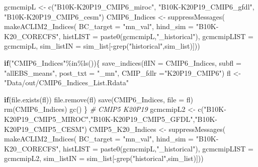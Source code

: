 \documentclass[
]{article}
\newenvironment{Shaded}{\begin{snugshade}}{\end{snugshade}}
\newcommand{\AttributeTok}[1]{\textcolor[rgb]{0.77,0.63,0.00}{#1}}
\newcommand{\CommentTok}[1]{\textcolor[rgb]{0.56,0.35,0.01}{\textit{#1}}}
\newcommand{\ControlFlowTok}[1]{\textcolor[rgb]{0.13,0.29,0.53}{\textbf{#1}}}
\newcommand{\FunctionTok}[1]{\textcolor[rgb]{0.00,0.00,0.00}{#1}}
\newcommand{\NormalTok}[1]{#1}
\newcommand{\OtherTok}[1]{\textcolor[rgb]{0.56,0.35,0.01}{#1}}
\newcommand{\SpecialCharTok}[1]{\textcolor[rgb]{0.00,0.00,0.00}{#1}}
\newcommand{\StringTok}[1]{\textcolor[rgb]{0.31,0.60,0.02}{#1}}
\begin{document}
\begin{Shaded}
\begin{Highlighting}[]
\NormalTok{    gcmcmipL }\OtherTok{\textless{}{-}} \FunctionTok{c}\NormalTok{(}\StringTok{"B10K{-}K20P19\_CMIP6\_miroc"}\NormalTok{,}
                  \StringTok{"B10K{-}K20P19\_CMIP6\_gfdl"}\NormalTok{,}
                  \StringTok{"B10K{-}K20P19\_CMIP6\_cesm"}\NormalTok{) }
\NormalTok{    CMIP6\_Indices }\OtherTok{\textless{}{-}} \FunctionTok{suppressMessages}\NormalTok{(}
                        \FunctionTok{makeACLIM2\_Indices}\NormalTok{(}
                        \AttributeTok{BC\_target =} \StringTok{"mn\_val"}\NormalTok{,}
                        \AttributeTok{hind\_sim  =}  \StringTok{"B10K{-}K20\_CORECFS"}\NormalTok{,}
                        \AttributeTok{histLIST  =} \FunctionTok{paste0}\NormalTok{(gcmcmipL,}\StringTok{"\_historical"}\NormalTok{),}
                        \AttributeTok{gcmcmipLIST =}\NormalTok{ gcmcmipL,}
                        \AttributeTok{sim\_listIN =}\NormalTok{ sim\_list[}\SpecialCharTok{{-}}\FunctionTok{grep}\NormalTok{(}\StringTok{"historical"}\NormalTok{,sim\_list)]))}
    
     \ControlFlowTok{if}\NormalTok{(}\StringTok{"CMIP6\_Indices"}\SpecialCharTok{\%in\%}\FunctionTok{ls}\NormalTok{())\{                 }
      \FunctionTok{save\_indices}\NormalTok{(}\AttributeTok{flIN =}\NormalTok{ CMIP6\_Indices, }
                   \AttributeTok{subfl =} \StringTok{"allEBS\_means"}\NormalTok{,}
                   \AttributeTok{post\_txt =} \StringTok{"\_mn"}\NormalTok{,}
                   \AttributeTok{CMIP\_fdlr =}\StringTok{"K20P19\_CMIP6"}\NormalTok{)}
\NormalTok{      fl }\OtherTok{\textless{}{-}} \StringTok{"Data/out/CMIP6\_Indices\_List.Rdata"}
      
      \ControlFlowTok{if}\NormalTok{(}\FunctionTok{file.exists}\NormalTok{(fl)) }\FunctionTok{file.remove}\NormalTok{(fl)}
      \FunctionTok{save}\NormalTok{(CMIP6\_Indices, }\AttributeTok{file =}\NormalTok{ fl)}
      \FunctionTok{rm}\NormalTok{(CMIP6\_Indices)}
      \FunctionTok{gc}\NormalTok{()}
\NormalTok{     \}}
    \CommentTok{\# CMIP5 K20P19}
\NormalTok{    gcmcmipL2 }\OtherTok{\textless{}{-}} \FunctionTok{c}\NormalTok{(}\StringTok{"B10K{-}K20P19\_CMIP5\_MIROC"}\NormalTok{,}\StringTok{"B10K{-}K20P19\_CMIP5\_GFDL"}\NormalTok{,}\StringTok{"B10K{-}K20P19\_CMIP5\_CESM"}\NormalTok{) }
\NormalTok{    CMIP5\_K20\_Indices }\OtherTok{\textless{}{-}} \FunctionTok{suppressMessages}\NormalTok{(}
                        \FunctionTok{makeACLIM2\_Indices}\NormalTok{(}
                        \AttributeTok{BC\_target =} \StringTok{"mn\_val"}\NormalTok{,}
                        \AttributeTok{hind\_sim  =}  \StringTok{"B10K{-}K20\_CORECFS"}\NormalTok{,}
                        \AttributeTok{histLIST  =} \FunctionTok{paste0}\NormalTok{(gcmcmipL,}\StringTok{"\_historical"}\NormalTok{),}
                        \AttributeTok{gcmcmipLIST =}\NormalTok{ gcmcmipL2,}
                        \AttributeTok{sim\_listIN =}\NormalTok{ sim\_list[}\SpecialCharTok{{-}}\FunctionTok{grep}\NormalTok{(}\StringTok{"historical"}\NormalTok{,sim\_list)]))}
    

\end{Highlighting}
\end{Shaded}
\end{document}
